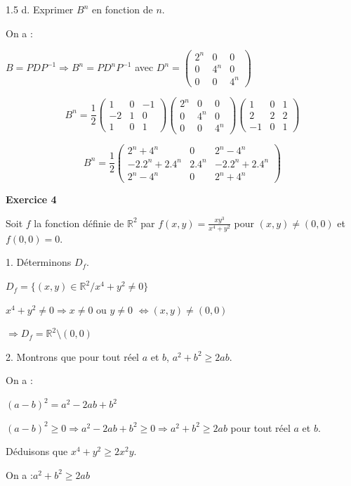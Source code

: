 \documentclass[12pt]{article}
\begin{document}
\begin{spacing}{1.5}
d. Exprimer $B^n$ en fonction de $n$.


 On a :

$B=PDP^{-1}\Rightarrow B^n=PD^nP^{-1}$ avec $D^n=\begin{pmatrix}
2^n & 0 & 0 \\ 
0 & 4^n & 0 \\ 
0 & 0 & 4^n
\end{pmatrix}$

\[
B^n=\frac{1}{2}\begin{pmatrix}
1 & 0 & -1 \\ 
-2 & 1 & 0 \\ 
1 & 0 & 1
\end{pmatrix}\begin{pmatrix}
2^n & 0 & 0 \\ 
0 & 4^n & 0 \\ 
0 & 0 & 4^n
\end{pmatrix}\begin{pmatrix}
1 & 0 & 1 \\ 
2 & 2 & 2 \\ 
-1 & 0 & 1
\end{pmatrix}\]

\[B^n=\frac{1}{2}\begin{pmatrix}
2^n+4^n & 0 & 2^n-4^n \\ 
-2.2^n+2.4^n & 2.4^n & -2.2^n+2.4^n \\ 
2^n-4^n & 0 & 2^n+4^n
\end{pmatrix}
\]

\medskip\textbf{Exercice 4}

Soit $f$ la fonction définie de $\mathbb{R}^2$ par $f(x,y) = \frac{xy^3}{x^4 + y^2}$ pour $(x,y)\neq(0,0)$ et $f(0,0) = 0$.

1. Déterminons $D_f$.

$D_f=\{(x,y)\in \mathbb{R}^2/x^4 + y^2 \neq 0\}$

$x^4 + y^2 \neq 0 \Rightarrow x\neq 0$ ou $y\neq 0$ $\Leftrightarrow (x,y)\neq (0,0)$

$\Rightarrow D_f=\mathbb{R}^2\setminus (0,0)$

2. Montrons que pour tout réel $a$ et $b$, $a^2 + b^2\geq 2ab$.

On a :

$(a-b)^2=a^2-2ab+b^2$

$(a-b)^2\geq 0\Rightarrow a^2-2ab+b^2\geq 0\Rightarrow a^2 + b^2\geq 2ab$ pour tout réel $a$ et $b$.

Déduisons que $x^4+y^2\geq 2x^2y$. 

On a :$a^2 + b^2\geq 2ab$


\end{spacing}
\end{document}
